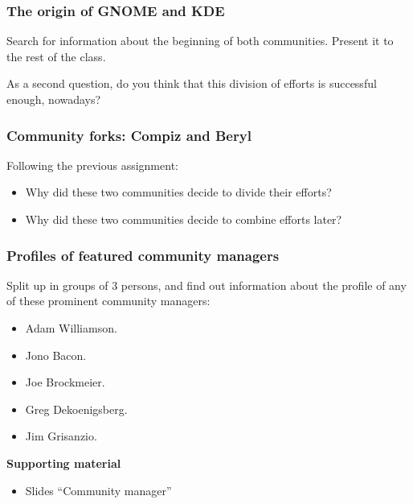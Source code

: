 \documentclass[a4paper]{article}
\begin{document}
\subsubsection{The origin of GNOME and KDE}
\label{sub:gnome-kde}

Search for information about the beginning of both communities. Present it to the rest of the class.

As a second question, do you think that this division of efforts is successful enough, nowadays? 

\subsubsection{Community forks: Compiz and Beryl}
\label{sub:compiz-beryl}

Following the previous assignment: 
\begin{itemize}
 \item Why did these two communities decide to divide their efforts?
 \item Why did these two communities decide to combine efforts later? 
\end{itemize}

\subsubsection{Profiles of featured community managers}
\label{sub:community-managers}

Split up in groups of 3 persons, and find out information about the profile of any of these prominent community managers:

\begin{itemize}
 \item Adam Williamson.
 \item Jono Bacon.
 \item Joe Brockmeier.
 \item Greg Dekoenigsberg.
 \item Jim Grisanzio.
\end{itemize}

\textbf{Supporting material}

\begin{itemize}
\item Slides ``Community manager''
\end{itemize}

\end{document}
